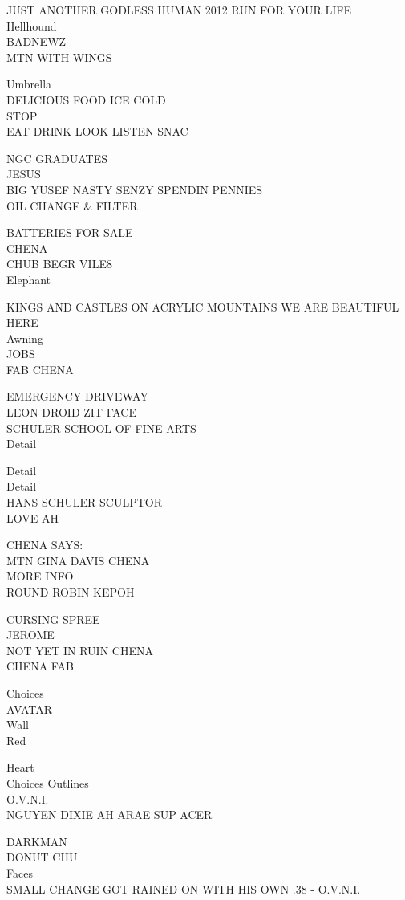 \documentclass[10pt,letterpaper]{article}
\begin{document}
JUST ANOTHER GODLESS HUMAN 2012 RUN FOR YOUR LIFE\\
Hellhound\\
BADNEWZ\\
MTN WITH WINGS

Umbrella\\
DELICIOUS FOOD ICE COLD\\
STOP\\
EAT DRINK LOOK LISTEN SNAC

NGC GRADUATES\\
JESUS\\
BIG YUSEF NASTY SENZY SPENDIN PENNIES\\
OIL CHANGE \& FILTER

BATTERIES FOR SALE\\
CHENA\\
CHUB BEGR VILE8\\
Elephant

KINGS AND CASTLES ON ACRYLIC MOUNTAINS WE ARE BEAUTIFUL HERE\\
Awning\\
JOBS\\
FAB CHENA

EMERGENCY DRIVEWAY\\
LEON DROID ZIT FACE\\
SCHULER SCHOOL OF FINE ARTS\\
Detail

Detail\\
Detail\\
HANS SCHULER SCULPTOR\\
LOVE AH

CHENA SAYS:\\
MTN GINA DAVIS CHENA\\
MORE INFO\\
ROUND ROBIN KEPOH

CURSING SPREE\\
JEROME\\
NOT YET IN RUIN CHENA\\
CHENA FAB

Choices\\
AVATAR\\
Wall\\
Red

Heart\\
Choices Outlines\\
O.V.N.I.\\
NGUYEN DIXIE AH ARAE SUP ACER

DARKMAN\\
DONUT CHU\\
Faces\\
SMALL CHANGE GOT RAINED ON WITH HIS OWN .38 {-} O.V.N.I.
\end{document}
